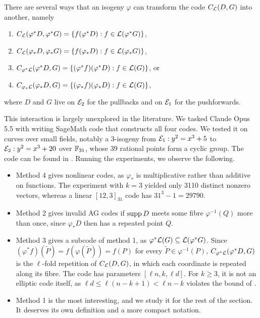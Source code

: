 \documentclass[twocolumn, 11pt]{scrartcl}
\begin{document}
There are several ways that an isogeny $\varphi$ can transform the code $C_\mathcal{L}(D,G)$ into another, namely
\begin{enumerate}[label={\arabic*.}, left=0pt]
\item $C_\mathcal{L}(\varphi^*D, \varphi^*G)=\{f(\varphi^*D):f\in\mathcal{L}(\varphi^*G)\}$,
\item $C_\mathcal{L}(\varphi_*D, \varphi_*G)=\{f(\varphi_*D):f\in\mathcal{L}(\varphi_*G)\}$,
\item $C_{\varphi^*\mathcal{L}}(\varphi^*D,G)=\{(\varphi^*f)(\varphi^*D):f\in\mathcal{L}(G)\}$, or
\item $C_{\varphi_*\mathcal{L}}(\varphi_*D,G)=\{(\varphi_*f)(\varphi_*D):f\in\mathcal{L}(G)\}$,
\end{enumerate}
where $D$ and $G$ live on $\mathcal{E}_2$ for the pullbacks and on $\mathcal{E}_1$ for the pushforwards.

This interaction is largely unexplored in the literature. We tasked Claude Opus 5.5 with writing SageMath code that constructs all four codes. We tested it on curves over small fields, notably a 3-isogeny from $\mathcal{E}_1:y^2=x^3+5$ to $\mathcal{E}_2:y^2=x^3+20$ over $\mathbb{F}_{31}$, whose 39 rational points form a cyclic group. The code can be found in \cite{code-experiments}. Running the experiments, we observe the following.
\begin{itemize}
    \item Method 4 gives nonlinear codes, as $\varphi_*$ is multiplicative rather than additive on functions. The experiment with $k=3$ yielded only 3110 distinct nonzero vectors, whereas a linear $[12,3]_{31}$ code has $31^3-1=29790$.
    \item Method 2 gives invalid AG codes if $\operatorname{supp} D$ meets some fibre $\varphi^{-1}(Q)$ more than once, since $\varphi_*D$ then has a repeated point $Q$.
    \item Method 3 gives a subcode of method 1, as $\varphi^*\mathcal{L}(G)\subseteq\mathcal{L}(\varphi^*G)$. Since $(\varphi^*f)(\tilde P)=f(\varphi(\tilde P))=f(P)$ for every $\tilde P\in\varphi^{-1}(P)$, $C_{\varphi^*\mathcal{L}}(\varphi^*D,G)$ is the $\ell$-fold repetition of $C_\mathcal{L}(D,G)$, in which each coordinate is repeated along its fibre. The code has parameters $[\ell n,k,\ell d]$. For $k\geq3$, it is not an elliptic code itself, as $\ell d\leq\ell(n-k+1)<\ell n-k$ violates the bound of .
    \item Method 1 is the most interesting, and we study it for the rest of the section. It deserves its own definition and a more compact notation.
\end{itemize}
\end{document}
